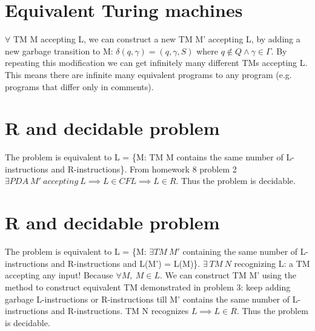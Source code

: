 \documentclass{article}
\begin{document}
\section{Equivalent Turing machines}
$\forall$ TM M accepting L, we can construct a new TM M' accepting L, by adding
a new garbage transition to M: $\delta(q, \gamma) = (q, \gamma, S)$ where $q
\notin Q \land \gamma \in \Gamma$. By repeating this modification we can get
infinitely many different TMs accepting L. This means there are infinite many
equivalent programs to any program (e.g. programs that differ only in comments).

\section{R and decidable problem}
The problem is equivalent to L = \{M: TM M contains the same number of
L-instructions and R-instructions\}. From homework 8 problem 2 $\exists PDA \ M'
\ accepting \ L \implies L \in CFL \implies L \in R$. Thus the problem is
decidable.

\section{R and decidable problem}
The problem is equivalent to L = \{M: $\exists TM \ M'$ containing the same
number of L-instructions and R-instructions and L(M') = L(M)\}. $\exists \ TM \
N$ recognizing L: a TM accepting any input! Because $\forall M, \ M \in L$. We
can construct TM M' using the method to construct equivalent TM demonstrated in
problem 3: keep adding garbage L-instructions or R-instructions till M' contains
the same number of L-instructions and R-instructions. TM N recognizes $L
\implies L \in R$. Thus the problem is decidable.
\end{document}
